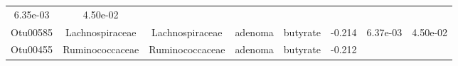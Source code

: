 \documentclass[11pt,]{article}
\begin{document}
\begin{longtable}[]{@{}cccccccc@{}}
\begin{minipage}[t]{0.08\columnwidth}
6.35e-03\strut
\end{minipage} & \begin{minipage}[t]{0.08\columnwidth}\centering\strut
4.50e-02\strut
\end{minipage}\tabularnewline
\begin{minipage}[t]{0.08\columnwidth}\centering\strut
Otu00585\strut
\end{minipage} & \begin{minipage}[t]{0.15\columnwidth}\centering\strut
Lachnospiraceae\strut
\end{minipage} & \begin{minipage}[t]{0.15\columnwidth}\centering\strut
Lachnospiraceae\strut
\end{minipage} & \begin{minipage}[t]{0.08\columnwidth}\centering\strut
adenoma\strut
\end{minipage} & \begin{minipage}[t]{0.09\columnwidth}\centering\strut
butyrate\strut
\end{minipage} & \begin{minipage}[t]{0.07\columnwidth}\centering\strut
-0.214\strut
\end{minipage} & \begin{minipage}[t]{0.08\columnwidth}\centering\strut
6.37e-03\strut
\end{minipage} & \begin{minipage}[t]{0.08\columnwidth}\centering\strut
4.50e-02\strut
\end{minipage}\tabularnewline
\begin{minipage}[t]{0.08\columnwidth}\centering\strut
Otu00455\strut
\end{minipage} & \begin{minipage}[t]{0.15\columnwidth}\centering\strut
Ruminococcaceae\strut
\end{minipage} & \begin{minipage}[t]{0.15\columnwidth}\centering\strut
Ruminococcaceae\strut
\end{minipage} & \begin{minipage}[t]{0.08\columnwidth}\centering\strut
adenoma\strut
\end{minipage} & \begin{minipage}[t]{0.09\columnwidth}\centering\strut
butyrate\strut
\end{minipage} & \begin{minipage}[t]{0.07\columnwidth}\centering\strut
-0.212\strut
\end{minipage} & \begin{minipage}[t]{0.08\columnwidth}\centering\strut

\end{minipage}
\end{longtable}
\end{document}
